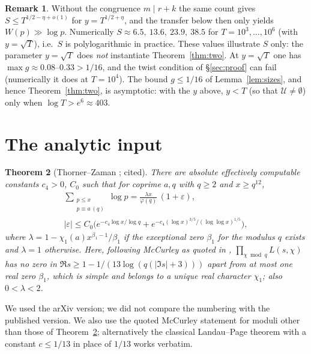 \documentclass[11pt,reqno]{amsart}
\newtheorem{theorem}{Theorem}[section]
\theoremstyle{definition}
\newtheorem{remark}[theorem]{Remark}
\newcommand{\cU}{\mathcal U}
\begin{document}
\begin{remark}
Without the congruence $m\mid r+k$ the same count gives $S\le T^{1/2-\eta+o(1)}$
for $y=T^{1/2+\eta}$, and the transfer below then only yields $W(p)\gg\log p$.
Numerically $S\approx 6.5,\ 13.6,\ 23.9,\ 38.5$ for $T=10^3,\dots,10^6$ (with
$y=\sqrt T$), i.e.\ $S$ is polylogarithmic in practice.  These values
illustrate $S$ only: the parameter $y=\sqrt T$ does \emph{not} instantiate
Theorem~\ref{thm:two}.  At $y=\sqrt T$ one has $\max g\approx0.08$--$0.33>1/16$,
and the twist condition of \S\ref{sec:proof} can fail (numerically it does
at $T=10^4$).  The bound $g\le1/16$ of Lemma~\ref{lem:sizes}, and hence
Theorem~\ref{thm:two}, is asymptotic: with the $y$ above, $y<T$ (so that
$\cU\ne\emptyset$) only when $\log T>e^6\approx403$.
\end{remark}

\section{The analytic input}\label{sec:analytic}

\begin{theorem}[Thorner--Zaman {\cite[Cor.~1.4 and Rem.~1.5]{TZ}}; cited]\label{thm:TZ}
There are absolute effectively computable constants $c_4>0$, $C_0$ such
that for coprime $a,q$ with $q\ge2$ and $x\ge q^{12}$,
\begin{gather*}
 \sum_{\substack{p\le x\\ p\equiv a\,(q)}}\log p=\frac{\lambda x}{\varphi(q)}\,(1+\varepsilon),\\
 |\varepsilon|\le C_0\Big(e^{-c_4\log x/\log q}+e^{-c_4(\log x)^{3/5}/(\log\log x)^{1/5}}\Big),
\end{gather*}
where $\lambda=1-\chi_1(a)x^{\beta_1-1}/\beta_1$ if the exceptional zero $\beta_1$
for the modulus $q$ exists and $\lambda=1$ otherwise.  Here, following
McCurley \cite{McC} as quoted in \cite[p.~1]{TZ}, $\prod_{\chi\bmod q}L(s,\chi)$
has no zero in $\Re s\ge1-1/(13\log(q(|\Im s|+3)))$ apart from at most one
real zero $\beta_1$, which is simple and belongs to a unique real character
$\chi_1$; also $0<\lambda<2$.
\end{theorem}

We used the arXiv version; we did not compare the numbering with the
published version.  We also use the quoted McCurley statement for moduli
other than those of Theorem~\ref{thm:TZ}; alternatively the classical
Landau--Page theorem \cite[Ch.~14]{Dav} with a constant $c\le1/13$ in place
of $1/13$ works verbatim.
\end{document}
